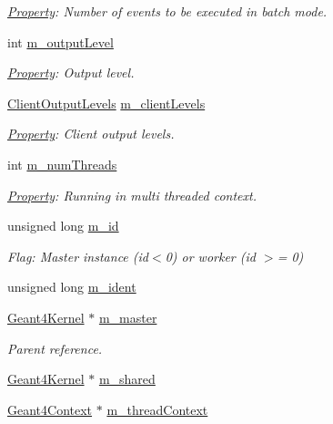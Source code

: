 \begin{DoxyCompactItemize}
\begin{DoxyCompactList}\small\item\em \hyperlink{class_d_d4hep_1_1_property}{Property}\+: Number of events to be executed in batch mode. \end{DoxyCompactList}\item 
int \hyperlink{class_d_d4hep_1_1_simulation_1_1_geant4_kernel_a419eed43ed023a0b43a2ddc44f474708}{m\+\_\+output\+Level}
\begin{DoxyCompactList}\small\item\em \hyperlink{class_d_d4hep_1_1_property}{Property}\+: Output level. \end{DoxyCompactList}\item 
\hyperlink{class_d_d4hep_1_1_simulation_1_1_geant4_kernel_a259066f5e9a56bdbfc9718a2b42b8b06}{Client\+Output\+Levels} \hyperlink{class_d_d4hep_1_1_simulation_1_1_geant4_kernel_a6693f4923ea60f878c15f665edf79de2}{m\+\_\+client\+Levels}
\begin{DoxyCompactList}\small\item\em \hyperlink{class_d_d4hep_1_1_property}{Property}\+: Client output levels. \end{DoxyCompactList}\item 
int \hyperlink{class_d_d4hep_1_1_simulation_1_1_geant4_kernel_a402cfabce5a04002713b4e35569911d7}{m\+\_\+num\+Threads}
\begin{DoxyCompactList}\small\item\em \hyperlink{class_d_d4hep_1_1_property}{Property}\+: Running in multi threaded context. \end{DoxyCompactList}\item 
unsigned long \hyperlink{class_d_d4hep_1_1_simulation_1_1_geant4_kernel_ad9fa311cf783a581dc24b158b754f3bc}{m\+\_\+id}
\begin{DoxyCompactList}\small\item\em Flag\+: Master instance (id$<$0) or worker (id $>$= 0) \end{DoxyCompactList}\item 
unsigned long \hyperlink{class_d_d4hep_1_1_simulation_1_1_geant4_kernel_ac7d95e62b3a0cb5180bdb3c20bd79a1d}{m\+\_\+ident}
\item 
\hyperlink{class_d_d4hep_1_1_simulation_1_1_geant4_kernel}{Geant4\+Kernel} $\ast$ \hyperlink{class_d_d4hep_1_1_simulation_1_1_geant4_kernel_a5d1ef9677e88ba8fc503d1cb70b84cf8}{m\+\_\+master}
\begin{DoxyCompactList}\small\item\em Parent reference. \end{DoxyCompactList}\item 
\hyperlink{class_d_d4hep_1_1_simulation_1_1_geant4_kernel}{Geant4\+Kernel} $\ast$ \hyperlink{class_d_d4hep_1_1_simulation_1_1_geant4_kernel_a47da20469676a2497cbf580428984362}{m\+\_\+shared}
\item 
\hyperlink{class_d_d4hep_1_1_simulation_1_1_geant4_context}{Geant4\+Context} $\ast$ \hyperlink{class_d_d4hep_1_1_simulation_1_1_geant4_kernel_a774c57eb5d21094d0ecca5db90f24998}{m\+\_\+thread\+Context}
\end{DoxyCompactItemize}


